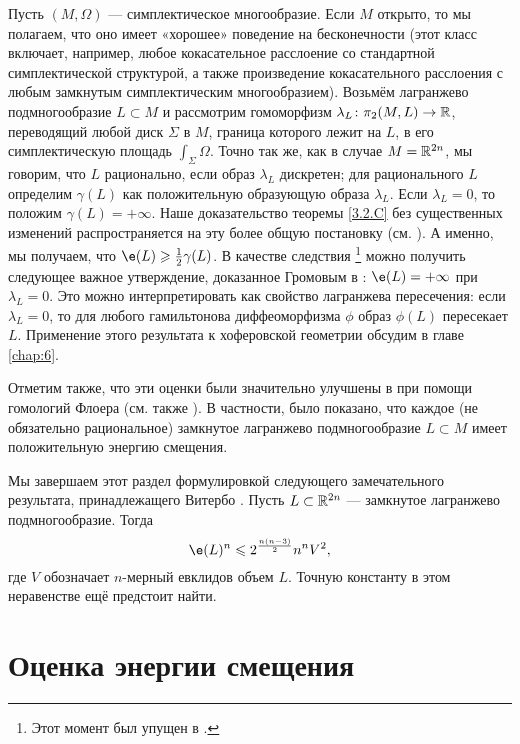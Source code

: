 \begin{ex}{}\label{3.2.G}
Пусть $(M, \Omega)$ — симплектическое многообразие.
Если $M$ открыто, то мы полагаем, что оно имеет «хорошее» поведение на
бесконечности (этот класс включает, например, любое кокасательное
расслоение со стандартной симплектической структурой, а также
произведение кокасательного расслоения с любым замкнутым
симплектическим многообразием). 
Возьмём лагранжево подмногообразие $L \subset M$ и рассмотрим
гомоморфизм $\lambda_L\colon \pi_2 (M, L) \z\to \RR$, переводящий любой
диск $\Sigma$ в $M$, граница которого лежит на $L$, в его
симплектическую площадь $\int_\Sigma \Omega$. 
Точно так же, как в случае $M = \mathbb{R}^{2n}$, мы говорим, что $L$
рационально, если образ $\lambda_L$ дискретен; для рационального $L$
определим $\gamma (L)$ как положительную образующую образа
$\lambda_L$. 
Если $\lambda_L = 0$, то положим $\gamma (L) = + \infty$.
Наше доказательство теоремы \ref{3.2.C} без существенных изменений
распространяется на эту более общую постановку (см. \cite{P1}). 
А именно, мы получаем, что $\e (L) \ge \tfrac12 \gamma (L)$.
В качестве следствия%
\footnote{Этот момент был упущен в \cite[с. 359]{P1}.}
можно получить следующее важное утверждение, доказанное Громовым в \cite{G1}:
$\e (L) = + \infty$ при $\lambda_L = 0$.
Это можно интерпретировать как свойство лагранжева пересечения: если $\lambda_L = 0$, то  для любого гамильтонова диффеоморфизма $\phi$ образ $\phi (L)$ пересекает $L$.
Применение этого результата к хоферовской геометрии обсудим в главе \ref{chap:6}.

Отметим также, что эти оценки были значительно улучшены в
\cite{Ch} при помощи гомологий Флоера (см. также
\cite{O3}). 
В частности, было показано, что каждое (не обязательно рациональное) замкнутое лагранжево подмногообразие $L \subset M$ имеет положительную энергию смещения.
\end{ex}

\begin{ex}{}
Мы завершаем этот раздел формулировкой следующего замечательного результата, принадлежащего Витербо \cite{V2}.
Пусть $L \subset \mathbb{R}^{2n}$ — замкнутое лагранжево подмногообразие.
Тогда 
\[\e (L)^n \le 2^{\frac{n(n-3)}2} n^n V^2,\]
где $V$ обозначает $n$-мерный евклидов объем $L$.
Точную константу в этом неравенстве ещё предстоит найти. 
\end{ex}

\section{Оценка энергии смещения}\label{3.3}

